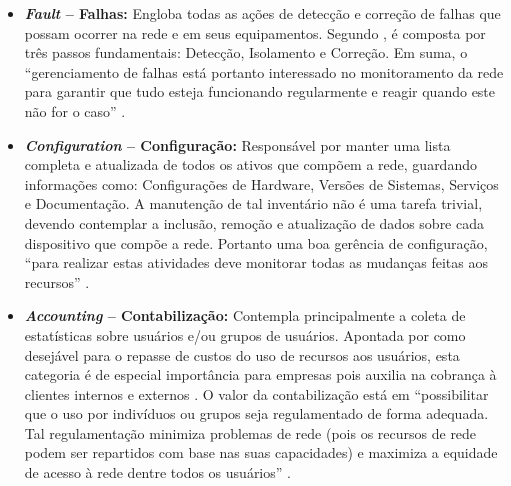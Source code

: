 \documentclass[twoside,english,brazilian]{UNISINOSmonografia}
\begin{document}
	\begin{itemize}
		\item \textbf{\textit{Fault} -- Falhas:} 
Engloba todas as ações de detecção e correção de falhas que possam ocorrer na 
rede e em seus equipamentos. 
Segundo , é composta por três passos fundamentais: 
Detecção, Isolamento e Correção. 
Em suma, o ``gerenciamento de falhas está portanto interessado no 
monitoramento da rede para garantir que tudo esteja funcionando regularmente e 
reagir quando este não for o caso'' \cite{Clemm2006}.

		\item \textbf{\textit{Configuration} -- Configuração:}
Responsável por manter uma lista completa e atualizada de todos os ativos que 
compõem a rede, guardando informações como: Configurações de Hardware, Versões 
de Sistemas, Serviços e Documentação.
\cite{Clemm2006,Ding2009,Mauro2009}
A manutenção de tal inventário não é uma tarefa trivial, devendo contemplar a 
inclusão, remoção e atualização de dados sobre cada dispositivo que compõe a 
rede. 
Portanto uma boa gerência de configuração, ``para realizar estas 
atividades deve monitorar todas as mudanças feitas aos recursos'' 
\cite{Wang2012}.


		\item \textbf{\textit{Accounting} -- Contabilização:}
Contempla principalmente a coleta de estatísticas sobre usuários e/ou grupos 
de usuários. 
Apontada por  como desejável para o repasse 
de custos do uso de recursos aos usuários, esta categoria é de especial 
importância para empresas pois auxilia na cobrança à clientes internos e 
externos \cite{Clemm2006}. 
O valor da contabilização está em ``possibilitar que o uso por indivíduos ou 
grupos seja regulamentado de forma adequada. Tal regulamentação minimiza 
problemas de rede (pois os recursos de rede podem ser repartidos com base nas 
suas capacidades) e maximiza a equidade de acesso à rede dentre todos os 
usuários'' \cite{Ding2009}.



\end{itemize}
\end{document}
